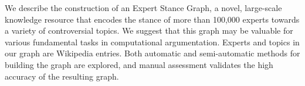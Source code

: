 We describe the construction of an Expert Stance Graph, a novel, large-scale knowledge resource that encodes the stance of more than 100,000 experts towards a variety of controversial topics. We suggest that this graph may be valuable for various fundamental tasks in computational argumentation. Experts and topics in our graph are Wikipedia entries. Both automatic and semi-automatic methods for building the graph are explored, and manual assessment validates the high accuracy of the resulting graph.
